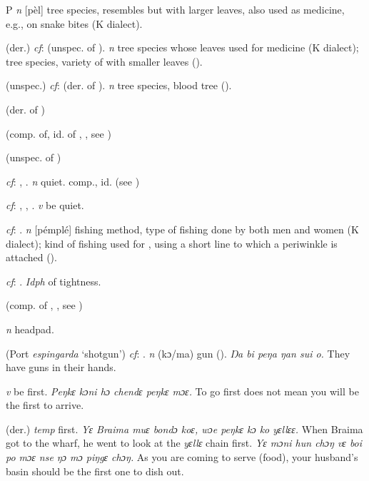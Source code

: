 \begin{letter}{P}
 \textit{n} [pèl] tree species, resembles  but with larger leaves, also used as medicine, e.g., on snake bites (K dialect). 

 (der.) \textit{cf}:  (unspec. of ). \textit{n} tree species whose leaves used for medicine (K dialect); tree species, variety of  with smaller leaves (\citealt{Pichl1967}).

 (unspec.) \textit{cf}:  (der. of ). \textit{n} tree species, blood tree (\citealt{Pichl1967}). 

 (der. of ) 

 (comp. of, id. of , , see ) 

 (unspec. of ) 

 \textit{cf}: , . \textit{n} quiet. comp., id.  (see )

 \textit{cf}: , , . \textit{v} be quiet.

 \textit{cf}: . \textit{n} [pémplé] fishing method, type of fishing done by both men and women (K dialect); kind of fishing used for , using a short line to which a periwinkle is attached (\citealt{Pichl1967}). 

 \textit{cf}: . \textit{Idph} of tightness.

 (comp. of , , see ) 

 \textit{n} headpad.

 (Port \textit{espingarda} ‘shotgun') \textit{cf}: . \textit{n} (kɔ/ma) gun (\citealt{Pichl1967}). \textit{Ŋa bi peŋa ŋan sui o.} They have guns in their hands.

 \textit{v} be first. \textit{Peŋkɛ kɔni hɔ chendɛ peŋkɛ mɔɛ.} To go first does not mean you will be the first to arrive.

 (der.) \textit{temp} first. \textit{Yɛ Braima muɛ bondɔ koɛ, wɔe peŋkɛ kɔ ko yɛllɛɛ.} When Braima got to the wharf, he went to look at the \textit{yɛllɛ} chain first. \textit{Yɛ mɔni hun chɔŋ vɛ boi po mɔɛ nse ŋɔ mɔ piŋgɛ chɔŋ.} As you are coming to serve (food), your husband's basin should be the first one to dish out.


\end{letter}

